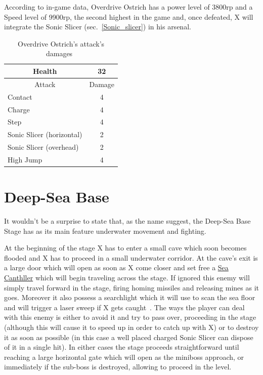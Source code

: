 According to in-game data, Overdrive Ostrich has a power level of 3800rp and a Speed level of 9900rp, the second highest in the game and, once defeated, X will integrate the Sonic Slicer (sec.~\ref{Sonic_slicer}) in his arsenal.

\begin{table}[htp]
	\centering
	\begin{tabular}[h]{l c}
		\toprule
		\multicolumn{1}{c}{Health}  & 32 \\
		\midrule
		\multicolumn{1}{c}{Attack} & \multicolumn{1}{c}{Damage}\\
		Contact & 4 \\
		Charge & 4\\
		Step& 4\\
		Sonic Slicer (horizontal) & 2\\
		Sonic Slicer (overhead) & 2\\
		High Jump & 4\\
		\bottomrule
	\end{tabular}
	\caption{Overdrive Ostrich's attack's damages~\cite{wiki:Overdrive_Ostrich}}
\end{table}

\section{Deep-Sea Base}
It wouldn't be a surprise to state that, as the name suggest, the Deep-Sea Base Stage has as its main feature underwater movement and fighting.

At the beginning of the stage X has to enter a small cave which soon becomes flooded and X has to proceed in a small underwater corridor. At the cave's exit  is a large door which will open as soon as X come closer and set free a \hyperlink{miniboss:Sea_Canthller}{Sea Canthller} which will begin traveling across the stage. If ignored this enemy will simply travel forward in the stage, firing homing missiles and releasing mines as it goes. Moreover it also possess a searchlight which it will use to scan the sea floor and will trigger a laser sweep if X gets caught~\cite{wiki:Sea_Canthller}. The ways the player can deal with this enemy is either to avoid it and try to pass over, proceeding in the stage (although this will cause it to speed up in order to catch up with X) or to destroy it as soon as possible (in this case a well placed charged Sonic Slicer can dispose of it in a single hit). In either cases the stage proceeds straightforward until reaching a large horizontal gate which will open as the miniboss approach, or immediately if the sub-boss is destroyed, allowing to proceed in the level.

